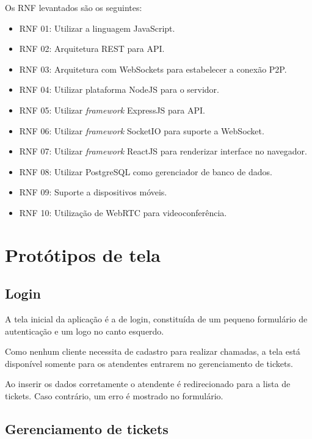 Os RNF levantados são os seguintes:
\begin{itemize}
	\item RNF 01: Utilizar a linguagem JavaScript.
    \item RNF 02: Arquitetura REST para API.
    \item RNF 03: Arquitetura com WebSockets para estabelecer a conexão P2P.
    \item RNF 04: Utilizar plataforma NodeJS para o servidor.
    \item RNF 05: Utilizar \textit{framework} ExpressJS para API.
    \item RNF 06: Utilizar \textit{framework} SocketIO para suporte a WebSocket.
    \item RNF 07: Utilizar \textit{framework} ReactJS para renderizar interface no navegador.
    \item RNF 08: Utilizar PostgreSQL como gerenciador de banco de dados.
    \item RNF 09: Suporte a dispositivos móveis.
    \item RNF 10: Utilização de WebRTC para videoconferência.
\end{itemize}

\section{Protótipos de tela}

\subsection{Login}

A tela inicial da aplicação é a de login, constituída de um pequeno formulário de autenticação e um logo no canto esquerdo. 

Como nenhum cliente necessita de cadastro para realizar chamadas, a tela está disponível somente para os atendentes entrarem no gerenciamento de tickets. 

 Ao inserir os dados corretamente o atendente é redirecionado para a lista de tickets.
 Caso contrário, um erro é mostrado no formulário.


\subsection{Gerenciamento de tickets}

